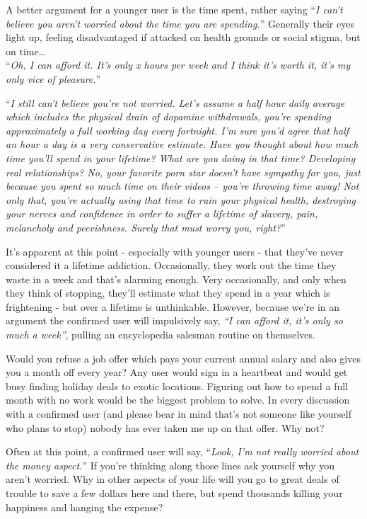 \documentclass[
]{book}
\begin{document}
A better argument for a younger user is the time spent, rather saying ``\emph{I can't believe you aren't worried about the time you are spending.}'' Generally their eyes light up, feeling disadvantaged if attacked on health grounds or social stigma, but on time\ldots{}\\
``\emph{Oh, I can afford it. It's only x hours per week and I think it's worth it, it's my only vice of pleasure.}''

``\emph{I still can't believe you're not worried. Let's assume a half hour daily average which includes the physical drain of dopamine withdrawals, you're spending approximately a full working day every fortnight. I'm sure you'd agree that half an hour a day is a very conservative estimate. Have you thought about how much time you'll spend in your lifetime? What are you doing in that time? Developing real relationships? No, your favorite porn star doesn't have sympathy for you, just because you spent so much time on their videos -- you're throwing time away! Not only that, you're actually using that time to ruin your physical health, destroying your nerves and confidence in order to suffer a lifetime of slavery, pain, melancholy and peevishness. Surely that must worry you, right?}''

It's apparent at this point - especially with younger users - that they've never considered it a lifetime addiction. Occasionally, they work out the time they waste in a week and that's alarming enough. Very occasionally, and only when they think of stopping, they'll estimate what they spend in a year which is frightening - but over a lifetime is unthinkable. However, because we're in an argument the confirmed user will impulsively say, \emph{``I can afford it, it's only so much a week''}, pulling an encyclopedia salesman routine on themselves.

Would you refuse a job offer which pays your current annual salary and also gives you a month off every year? Any user would sign in a heartbeat and would get busy finding holiday deals to exotic locations. Figuring out how to spend a full month with no work would be the biggest problem to solve. In every discussion with a confirmed user (and please bear in mind that's not someone like yourself who plans to stop) nobody has ever taken me up on that offer. Why not?

Often at this point, a confirmed user will say, ``\emph{Look, I'm not really worried about the money aspect.}'' If you're thinking along those lines ask yourself why you aren't worried. Why in other aspects of your life will you go to great deals of trouble to save a few dollars here and there, but spend thousands killing your happiness and hanging the expense?
\end{document}
